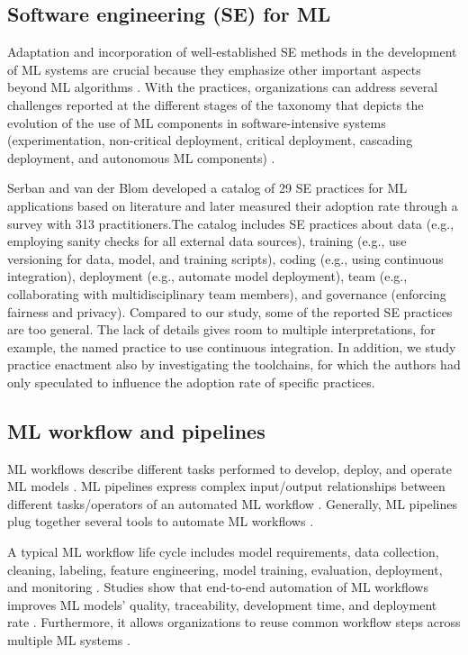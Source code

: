 
\subsection{Software engineering (SE) for ML}
Adaptation and incorporation of well-established SE methods in the development of ML systems are crucial \cite{Amershi2019}because they emphasize other important aspects beyond ML algorithms \cite{Sculley2015}. With the practices, organizations can address several challenges reported at the different stages of the taxonomy that depicts the evolution of the use of ML components in software-intensive systems (experimentation, non-critical deployment, critical deployment, cascading deployment, and autonomous ML components) \cite{Lwakatare2019}.

Serban and van der Blom \cite{Serban2020Practices} developed a catalog of 29 SE practices for ML applications based on literature and later measured their adoption rate through a survey with 313 practitioners.The catalog includes SE practices about data (e.g., employing sanity checks for all external data sources), training (e.g., use versioning for data, model, and training scripts), coding (e.g., using continuous integration), deployment (e.g., automate model deployment), team (e.g., collaborating with multidisciplinary team members), and governance (enforcing fairness and privacy). Compared to our study, some of the reported SE practices are too general. The lack of details gives room to multiple interpretations, for example, the named practice to use continuous integration. In addition, we study practice enactment also by investigating the toolchains, for which the authors \cite{Serban2020Practices} had only speculated to influence the adoption rate of specific practices. 

\subsection{ML workflow and pipelines}

ML workflows describe different tasks performed to develop, deploy, and operate ML models  \cite{Amershi2019}. ML pipelines express complex input/output relationships between different tasks/operators of an automated ML workflow \cite{Doris2021MLPipelines}. Generally, ML pipelines plug together several tools to automate ML workflows \cite{Hummer2019IBM}.

A typical ML workflow life cycle includes model requirements, data collection, cleaning, labeling, feature engineering, model training, evaluation, deployment, and monitoring  \cite{Amershi2019}. Studies show that end-to-end automation of ML workflows improves ML models’ quality, traceability, development time, and deployment rate  \cite{Doris2021MLPipelines, Hummer2019IBM}. Furthermore, it allows organizations to reuse common workflow steps across multiple ML systems \cite{Baylor2017, Hummer2019IBM}.

